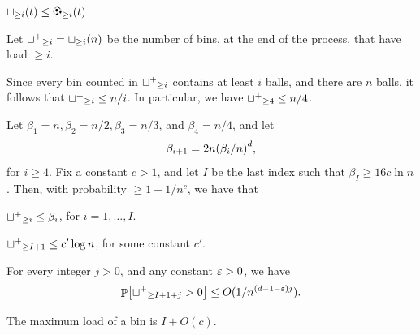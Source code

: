\begin{observation}
    $\binsY{i}{t} \leq \ballsY{i}{t}$.
\end{observation}

\newcommand{\BadEvent}{\mathcal{B}}%
\newcommand{\GoodEvent}{\mathcal{G}}%


Let $\BLX{i} = \binsY{i}{n}$ be the number of bins, at the end of the
process, that have load $\geq i$.

\begin{observation}
    Since every bin counted in ${{\sqcup^+{}}_{\geq i}}$ contains at least $i$ balls,
    and there are $n$ balls, it follows that ${{\sqcup^+{}}_{\geq i}} \leq n/i$.  In
    particular, we have ${{\sqcup^+{}}_{\geq 4}} \leq n/4$.
\end{observation}


\begin{lemma}
    Let $\beta_1 = n, \beta_2 = n/2, \beta_3=n/3$, and
    $\beta_4 = n/4$, and let
    \begin{equation*}
        \beta_{i+1} = 2 n \pth{\beta_i/n}^d,
    \end{equation*}
    for $i\geq 4$.  Fix a constant $c > 1$, and let $I$ be the last index
    such that $\beta_{I} \geq 16c\ln n$. Then, with probability
    $\geq 1-1/n^c$, we have that
    \begin{compactenumA}
        \smallskip%
        \item ${{\sqcup^+{}}_{\geq i}} \leq \beta_i$, for $i=1,\ldots, I$.
        \smallskip%
        \item ${{\sqcup^+{}}_{\geq I+1}} \leq c' \log n$, for some constant $c'$. %

        \smallskip%
        \item For every integer $j > 0$, and any constant ${\varepsilon} > 0$, we
        have
        \[
        \Prob{ \BLX{I+1+j} > 0} \leq O(1/n^{(d-1-\eps)j}).
        \]

        \smallskip%
        \item The maximum load of a bin is $I+O(c)$.
    \end{compactenumA}
\end{lemma}

